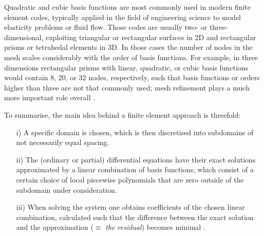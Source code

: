 Quadratic and cubic basis functions are most commonly used in modern finite element codes, typically applied in the field of engineering science to model elasticity problems or fluid flow. Those codes are usually two- or three-dimensional, exploiting triangular or rectangular surfaces in 2D and rectangular prisms or tetrahedal elements in 3D. In those cases the number of nodes in the mesh scales considerably with the order of basis functions. For example, in three dimensions rectangular prisms with linear, quadratic, or cubic basis functions would contain 8, 20, or 32 nodes, respectively, such that basis functions or orders higher than three are not that commonly used; mesh refinement plays a much more important role overall \citep{book_fem1, book_fem2, book_bathe2006}.

To summarise, the main idea behind a finite element approach is threefold:
\begin{enumerate}
  \item[i)] A specific domain is chosen, which is then discretised into subdomains of not necessarily equal spacing.
  \item[ii)] The (ordinary or partial) differential equations have their exact solutions approximated by a linear combination of basis functions, which consist of a certain choice of local piecewise polynomials that are zero outside of the subdomain under consideration.
  \item[iii)] When solving the system one obtains coefficients of the chosen linear combination, calculated such that the difference between the exact solution and the approximation ($\equiv$ \emph{the residual}) becomes minimal .
\end{enumerate}



